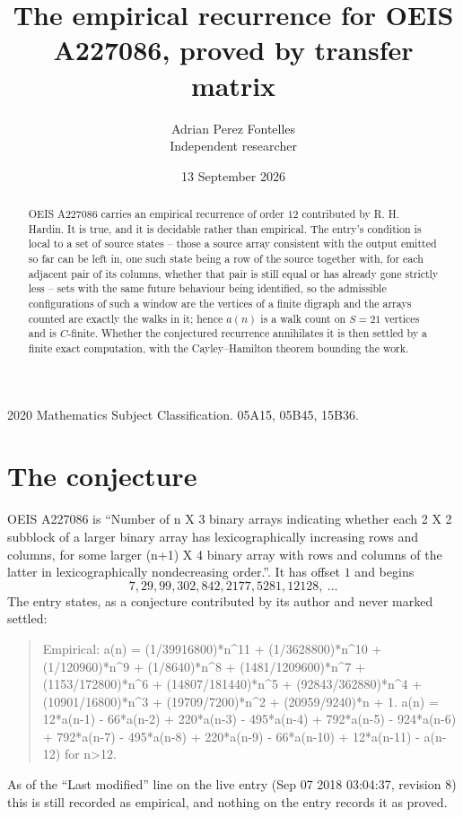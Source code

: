 \documentclass[11pt,a4paper]{article}
\title{The empirical recurrence for OEIS A227086, proved by transfer matrix}
\author{Adrian Perez Fontelles\\ \small Independent researcher}
\date{13 September 2026}
\theoremstyle{plain}
\theoremstyle{definition}
\begin{document}
\maketitle

\begin{abstract}
OEIS A227086 carries an empirical recurrence of order $12$ contributed by R. H. Hardin. It is
true, and it is decidable rather than empirical. The entry's condition is local to a set of source states -- those a source array consistent with the output emitted so far can be left in, one such state being a row of the source together with, for each adjacent pair of its columns, whether that pair is still equal or has already gone strictly less -- sets with the same future behaviour being identified, so
the admissible configurations of such a window are the vertices of a finite digraph and the
arrays counted are exactly the walks in it; hence $a(n)$ is a walk count on $S=21$ vertices
and is $C$-finite. Whether the conjectured recurrence annihilates it is then settled by a
finite exact computation, with the Cayley--Hamilton theorem bounding the work.
\end{abstract}

\noindent\small 2020 Mathematics Subject Classification. 05A15, 05B45, 15B36.\normalsize

\section{The conjecture}

OEIS A227086 is ``Number of n X 3 binary arrays indicating whether each 2 X 2 subblock of a larger binary array has lexicographically increasing rows and columns, for some larger (n+1) X 4 binary array with rows and columns of the latter in lexicographically nondecreasing order.''. It has offset $1$ and begins
\[
7, 29, 99, 302, 842, 2177, 5281, 12128,\ \dots
\]
The entry states, as a conjecture contributed by its author and never marked settled:
\begin{quote}
Empirical: a(n) = (1/39916800)*n\^{}11 + (1/3628800)*n\^{}10 + (1/120960)*n\^{}9 + (1/8640)*n\^{}8 + (1481/1209600)*n\^{}7 + (1153/172800)*n\^{}6 + (14807/181440)*n\^{}5 + (92843/362880)*n\^{}4 + (10901/16800)*n\^{}3 + (19709/7200)*n\^{}2 + (20959/9240)*n + 1. a(n) = 12*a(n-1) - 66*a(n-2) + 220*a(n-3) - 495*a(n-4) + 792*a(n-5) - 924*a(n-6) + 792*a(n-7) - 495*a(n-8) + 220*a(n-9) - 66*a(n-10) + 12*a(n-11) - a(n-12) for n>12.
\end{quote}
As of the ``Last modified'' line on the live entry (Sep 07 2018 03:04:37, revision 8) this is still
recorded as empirical, and nothing on the entry records it as proved.
\end{document}
